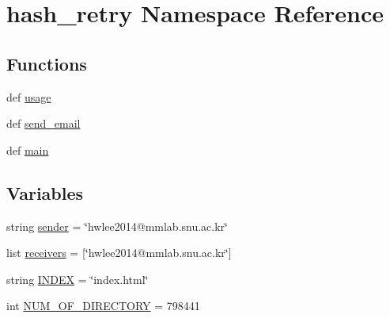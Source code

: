 \hypertarget{namespacehash__retry}{\section{hash\-\_\-retry Namespace Reference}
\label{namespacehash__retry}
}
\subsection*{Functions}
\begin{DoxyCompactItemize}
\item 
def \hyperlink{namespacehash__retry_ab750caa851e178ac0f422e073faed131}{usage}
\item 
def \hyperlink{namespacehash__retry_a380928e48f04560aa48521bcb45c6a1d}{send\-\_\-email}
\item 
def \hyperlink{namespacehash__retry_a3dc88d830fc129bf3d3715deb425b1ce}{main}
\end{DoxyCompactItemize}
\subsection*{Variables}
\begin{DoxyCompactItemize}
\item 
string \hyperlink{namespacehash__retry_af5f6d05310b66f02f22e47cd7233c3cd}{sender} = \char`\"{}hwlee2014@mmlab.\-snu.\-ac.\-kr\char`\"{}
\item 
list \hyperlink{namespacehash__retry_ab14a6482688f9131dbbe96e823c38962}{receivers} = \mbox{[}\char`\"{}hwlee2014@mmlab.\-snu.\-ac.\-kr\char`\"{}\mbox{]}
\item 
string \hyperlink{namespacehash__retry_a4c05f3670fe1899729908dd4372bcec1}{I\-N\-D\-E\-X} = \char`\"{}index.\-html\char`\"{}
\item 
int \hyperlink{namespacehash__retry_a943f2c8d6c8c601de55f75797eedc26a}{N\-U\-M\-\_\-\-O\-F\-\_\-\-D\-I\-R\-E\-C\-T\-O\-R\-Y} = 798441
\end{DoxyCompactItemize}


